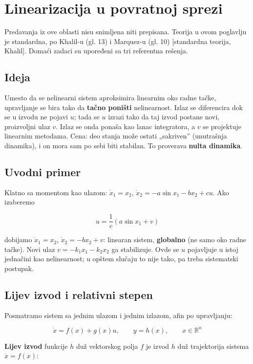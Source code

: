 \documentclass[11pt,a4paper,parskip=half,headsepline,numbers=noenddot]{scrartcl}
\DeclareRobustCommand{\izvor}[1]{{\small\color{izvorC}[#1]}}
\begin{document}
\section{Linearizacija u povratnoj sprezi}

Predavanja iz ove oblasti nisu snimljena niti prepisana. Teorija u ovom poglavlju je standardna, po Khalil-u (gl. 13) i Marquez-u (gl. 10) \izvor{standardna teorija, Khalil}. Domaći zadaci su upoređeni sa tri referentna rešenja.

\subsection{Ideja}

Umesto da se nelinearni sistem aproksimira linearnim oko radne tačke, upravljanje se bira tako da \textbf{tačno poništi} nelinearnost. Izlaz se diferencira dok se u izvodu ne pojavi \(u\); tada se \(u\) izrazi tako da taj izvod postane novi, proizvoljni ulaz \(v\). Izlaz se onda ponaša kao lanac integratora, a \(v\) se projektuje linearnim metodama. Cena: deo stanja može ostati „sakriven'' (unutrašnja dinamika), i on mora sam po sebi biti stabilan. To proverava \textbf{nulta dinamika}.

\subsection{Uvodni primer}

Klatno sa momentom kao ulazom: \(\dot x_1 = x_2\), \(\dot x_2 = -a\sin x_1 - bx_2 + cu\). Ako izaberemo

\[u = \frac{1}{c}\left(a\sin x_1 + v\right)\]

dobijamo \(\dot x_1 = x_2\), \(\dot x_2 = -bx_2 + v\): linearan sistem, \textbf{globalno} (ne samo oko radne tačke). Novi ulaz \(v = -k_1x_1 - k_2x_2\) ga stabilizuje. Ovde se \(u\) pojavljuje u istoj jednačini kao nelinearnost; u opštem slučaju to nije tako, pa treba sistematski postupak.

\subsection{Lijev izvod i relativni stepen}

Posmatramo sistem sa jednim ulazom i jednim izlazom, afin po upravljanju:

\[\dot x = f(x) + g(x)u, \qquad y = h(x), \qquad x \in \mathbb{R}^n\]

\textbf{Lijev izvod} funkcije \(h\) duž vektorskog polja \(f\) je izvod \(h\) duž trajektorija sistema \(\dot x = f(x)\):
\end{document}
